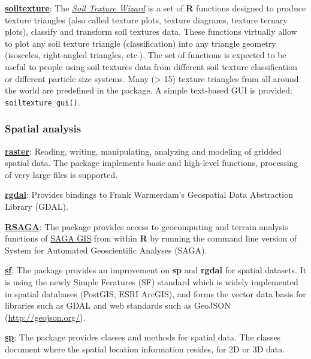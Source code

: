 \documentclass[10pt,b5paper,]{book}
\theoremstyle{definition}
\theoremstyle{definition}
\theoremstyle{definition}
\theoremstyle{remark}
\begin{document}
\href{https://CRAN.R-project.org/package=soiltexture}{\textbf{soiltexture}}:
The
\href{https://cran.r-project.org/web/packages/soiltexture/vignettes/soiltexture_vignette.pdf}{\emph{Soil
Texture Wizard}} is a set of \textbf{R} functions designed to produce
texture triangles (also called texture plots, texture diagrams, texture
ternary plots), classify and transform soil textures data. These
functions virtually allow to plot any soil texture triangle
(classification) into any triangle geometry (isosceles, right-angled
triangles, etc.). The set of functions is expected to be useful to
people using soil textures data from different soil texture
classification or different particle size systems. Many (\textgreater{}
15) texture triangles from all around the world are predefined in the
package. A simple text-based GUI is provided:
\texttt{soiltexture\_gui()}.

\hypertarget{spatial-analysis}{%
\subsubsection{Spatial analysis}\label{spatial-analysis}}

\href{https://CRAN.R-project.org/package=raster}{\textbf{raster}}:
Reading, writing, manipulating, analyzing and modeling of gridded
spatial data. The package implements basic and high-level functions,
processing of very large files is supported.

\href{https://CRAN.R-project.org/package=rgdal}{\textbf{rgdal}}:
Provides bindings to Frank Warmerdam's Geospatial Data Abstraction
Library (GDAL).

\href{https://CRAN.R-project.org/package=RSAGA}{\textbf{RSAGA}}: The
package provides access to geocomputing and terrain analysis functions
of \href{/url\%7Bhttp://www.saga-gis.org/en/index.html\%7D}{SAGA GIS}
from within \textbf{R} by running the command line version of System for
Automated Geoscientific Analyses (SAGA).

\href{https://cran.r-project.org/web/packages/sf/index.html}{\textbf{sf}}:
The package provides an improvement on \textbf{sp} and \textbf{rgdal}
for spatial datasets. It is using the newly Simple Feratures (SF)
standard which is widely implemented in spatial databases (PostGIS, ESRI
ArcGIS), and forms the vector data basis for libraries such as GDAL and
web standards such as GeoJSON (\url{http://geojson.org/}).

\href{https://CRAN.R-project.org/package=sp}{\textbf{sp}}: The package
provides classes and methods for spatial data. The classes document
where the spatial location information resides, for 2D or 3D data.
\end{document}
